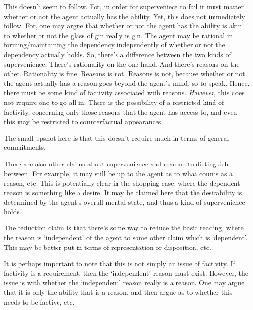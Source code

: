 \documentclass[10pt]{article}
\begin{document}
\begin{note}
  This doesn't seem to follow.
  For, in order for superveniece to fail it must matter whether or not the agent actually has the ability.
  Yet, this does not immediately follow.
  For, one may argue that whether or not the agent has the ability is akin to whether or not the glass of gin really is gin.
  The agent may be rational in forming/maintaining the dependency independently of whether or not the dependency actually holds.
  So, there's a difference between the two kinds of supervenience.
  There's rationality on the one hand.
  And there's reasons on the other.
  Rationality is fine.
  Reasons is not.
  Reasons is not, because whether or not the agent actually has a reason goes beyond the agent's mind, so to speak.
  Hence, there must be some kind of factivity associated with reasons.
  \emph{However}, this does not require one to go all in.
  There is the possibility of a restricted kind of factivity, concerning only those reasons that the agent has access to, and even this may be restricted to counterfactual appearances.

  The small upshot here is that this doesn't require much in terms of general commitments.

  There are also other claims about supervenience and reasons to distinguish between.
  For example, it may still be up to the agent as to what counts as a reason, etc.
  This is potentially clear in the shopping case, where the dependent reason is something like a desire.
  It may be claimed here that the desirability is determined by the agent's overall mental state, and thus a kind of supervenience holds.
\end{note}

\begin{note}
  The reduction claim is that there's some way to reduce the basic reading, where the reason is `independent' of the agent to some other claim which is `dependent'.
  This may be better put in terms of representation or disposition, etc.

  It is perhaps important to note that this is not simply an issue of factivity.
  If factivity is a requirement, then the `independent' reason must exist.
  However, the issue is with whether the `independent' reason really is a reason.
  One may argue that it is only the ability that is a reason, and then argue as to whether this needs to be factive, etc.
  \end{note}
\end{document}
